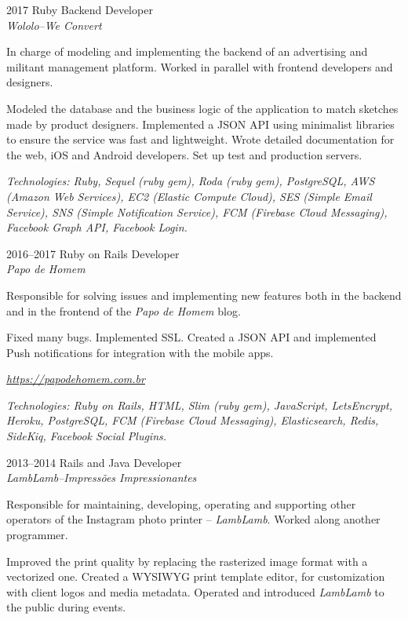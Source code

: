 \documentclass[a4paper]{simplecv}
\begin{document}
\begin{topic}
\item[2017] Ruby Backend Developer\\
	{\em\small Wololo--We Convert}

	In charge of modeling and implementing the backend of an advertising
	and militant management platform. Worked in parallel with frontend
	developers and designers.

	Modeled the database and the business logic of the application to match
	sketches made by product designers. Implemented a JSON API using
	minimalist libraries to ensure the service was fast and lightweight.
	Wrote detailed documentation for the web, iOS and Android developers.
	Set up test and production servers.

	{\em\scriptsize Technologies: Ruby, Sequel (ruby gem), Roda (ruby gem),
	PostgreSQL, AWS (Amazon Web Services), EC2 (Elastic Compute Cloud), SES
	(Simple Email Service), SNS (Simple Notification Service), FCM
	(Firebase Cloud Messaging), Facebook Graph API, Facebook Login.}

\item[2016--2017] Ruby on Rails Developer\\
	{\em\small Papo de Homem}

	Responsible for solving issues and implementing new features both in
	the backend and in the frontend of the \emph{Papo de Homem} blog.

	Fixed many bugs. Implemented SSL. Created a JSON API and implemented
	Push notifications for integration with the mobile apps.

	{\em\scriptsize \url{https://papodehomem.com.br}}

	{\em\scriptsize Technologies: Ruby on Rails, HTML, Slim (ruby gem),
	JavaScript, LetsEncrypt, Heroku, PostgreSQL, FCM (Firebase Cloud
	Messaging), Elasticsearch, Redis, SideKiq, Facebook Social Plugins.}

\item[2013--2014] Rails and Java Developer\\
	{\em\small LambLamb--Impressões Impressionantes}

	Responsible for maintaining, developing, operating and supporting other
	operators of the Instagram photo printer -- \emph{LambLamb}. Worked
	along another programmer.

	Improved the print quality by replacing the rasterized image format
	with a vectorized one. Created a WYSIWYG print template editor, for
	customization with client logos and media metadata. Operated and
	introduced \emph{LambLamb} to the public during events.


\end{topic}
\end{document}
